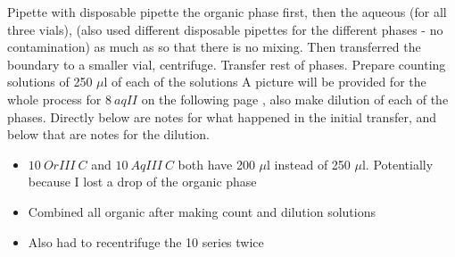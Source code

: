 \documentclass[idxtotoc,hyperref,openany,oneside]{labbook} %
\newcommand{\cmark}{\ding{51}}%
\newcommand{\done}{\rlap{$\square$}{\raisebox{2pt}{\large\hspace{1pt}\cmark}}%
  \hspace{-2.5pt}}
\begin{document}
\begin{todolist}
\item[\done]{Pipette with disposable pipette the organic phase
  first, then the aqueous (for all three vials),
  (also used different disposable pipettes for the
  different phases - no contamination)
  as much as so that there is no mixing.
  Then transferred the boundary to a smaller vial, centrifuge.
  Transfer rest of phases.
  Prepare counting solutions of 250 $\mu$l of each of the solutions
  A picture will be provided for the whole process for
  $\boxed{8\ aqII}$
  on the following page
  , also make dilution of each of the phases. Directly below
  are notes for what happened in the initial transfer,
  and below that are notes for the dilution.}
  \begin{itemize}
  \item{$\boxed{10\ OrIII\ C}$ and $\boxed{10\ AqIII\ C}$
    both have 200 $\mu$l instead of 250 $\mu$l. Potentially
    because I lost a drop of the organic phase}
  \item{Combined all organic after making count and dilution
    solutions}
  \item{Also had to recentrifuge the 10 series twice}
  \end{itemize}
  

\end{todolist}
\end{document}
